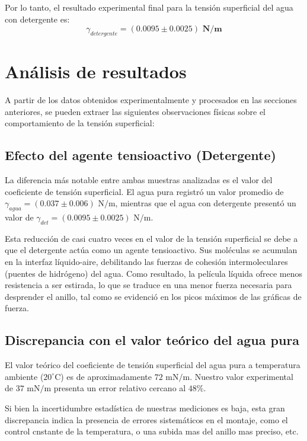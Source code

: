 \documentclass[11pt,a4paper]{article}
\begin{document}
Por lo tanto, el resultado experimental final para la tensión superficial del agua con detergente es:
\begin{equation}
    \gamma_{detergente} = \mathbf{(0.0095 \pm 0.0025) \text{ N/m}}
\end{equation}


\newpage
\section{Análisis de resultados}

A partir de los datos obtenidos experimentalmente y procesados en las secciones anteriores, se pueden extraer las siguientes observaciones físicas sobre el comportamiento de la tensión superficial:

\subsection{Efecto del agente tensioactivo (Detergente)}
La diferencia más notable entre ambas muestras analizadas es el valor del coeficiente de tensión superficial. El agua pura registró un valor promedio de \(\gamma_{agua} = (0.037 \pm 0.006) \text{ N/m}\), mientras que el agua con detergente presentó un valor de \(\gamma_{det} = (0.0095 \pm 0.0025) \text{ N/m}\). 

Esta reducción de casi cuatro veces en el valor de la tensión superficial se debe a que el detergente actúa como un agente tensioactivo. Sus moléculas se acumulan en la interfaz líquido-aire, debilitando las fuerzas de cohesión intermoleculares (puentes de hidrógeno) del agua. Como resultado, la película líquida ofrece menos resistencia a ser estirada, lo que se traduce en una menor fuerza necesaria para desprender el anillo, tal como se evidenció en los picos máximos de las gráficas de fuerza.

\subsection{Discrepancia con el valor teórico del agua pura}
El valor teórico del coeficiente de tensión superficial del agua pura a temperatura ambiente (\(20^\circ\text{C}\)) es de aproximadamente \(72 \text{ mN/m}\). Nuestro valor experimental de \(37 \text{ mN/m}\) presenta un error relativo cercano al \(48\%\). 

Si bien la incertidumbre estadística de nuestras mediciones es baja, esta gran discrepancia indica la presencia de errores sistemáticos en el montaje, como
el control cnstante de la temperatura, o una subida mas del anillo mas preciso, etc.
\end{document}

